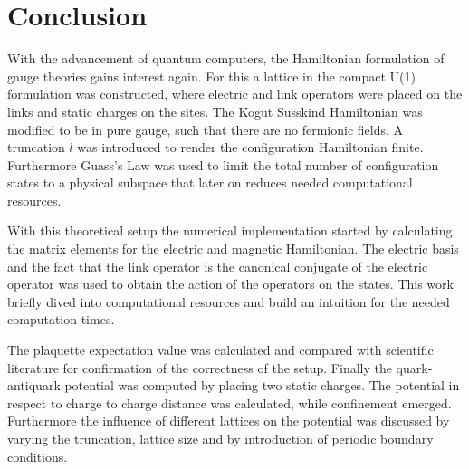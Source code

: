 \section{Conclusion}
With the advancement of quantum computers, the Hamiltonian formulation of gauge theories gains interest again. For this a lattice in the compact U(1) formulation was constructed, where electric and link operators were placed on the links and static charges on the sites. The Kogut Susskind Hamiltonian was modified to be in pure gauge, such that there are no fermionic fields. A truncation $l$ was introduced to render the configuration Hamiltonian finite. Furthermore Guass's Law was used to limit the total number of configuration states to a physical subspace that later on reduces needed computational resources.

With this theoretical setup the numerical implementation started by calculating the matrix elements for the electric and magnetic Hamiltonian. The electric basis and the fact that the link operator is the canonical conjugate of the electric operator was used to obtain the action of the operators on the states. This work briefly dived into computational resources and build an intuition for the needed computation times.

The plaquette expectation value was calculated and compared with scientific literature for confirmation of the correctness of the setup. Finally the quark-antiquark potential was computed by placing two static charges. The potential in respect to charge to charge distance was calculated, while confinement emerged. Furthermore the influence of different lattices on the potential was discussed by varying the truncation, lattice size and by introduction of periodic boundary conditions.

